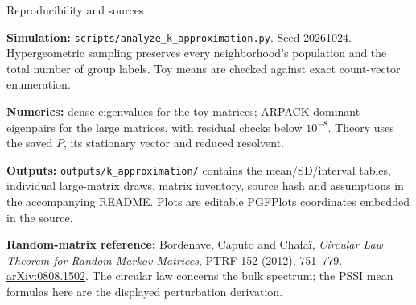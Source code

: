 \begin{frame}{Reproducibility and sources}
\small

\textbf{Simulation:} \texttt{scripts/analyze\_k\_approximation.py}. Seed 20261024. Hypergeometric sampling preserves every neighborhood's population and the total number of group labels. Toy means are checked against exact count-vector enumeration.
\medskip

\textbf{Numerics:} dense eigenvalues for the toy matrices; ARPACK dominant eigenpairs for the large matrices, with residual checks below $10^{-8}$. Theory uses the saved $P$, its stationary vector and reduced resolvent.
\medskip

\textbf{Outputs:} \texttt{outputs/k\_approximation/} contains the mean/SD/interval tables, individual large-matrix draws, matrix inventory, source hash and assumptions in the accompanying README. Plots are editable PGFPlots coordinates embedded in the source.
\medskip

\textbf{Random-matrix reference:} Bordenave, Caputo and Chafa\"i, \emph{Circular Law Theorem for Random Markov Matrices}, PTRF 152 (2012), 751--779. \href{https://arxiv.org/abs/0808.1502}{arXiv:0808.1502}. The circular law concerns the bulk spectrum; the PSSI mean formulas here are the displayed perturbation derivation.

\end{frame}
